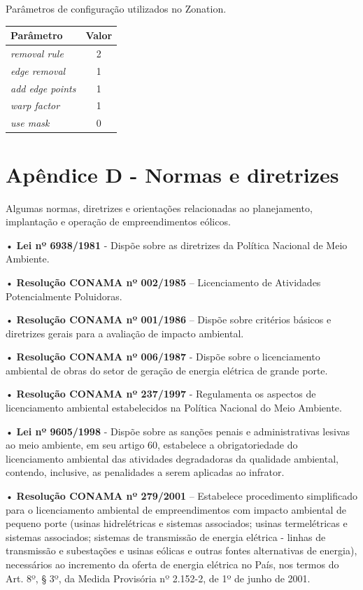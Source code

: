 \documentclass[
  oneside]{scrbook}
\begin{document}
Parâmetros de configuração utilizados no Zonation.

\begin{longtable}[t]{>{}lc}
\toprule
Parâmetro & Valor\\
\midrule
\em{removal rule} & 2\\
\em{edge removal} & 1\\
\em{add edge points} & 1\\
\em{warp factor} & 1\\
\em{use mask} & 0\\
\bottomrule
\end{longtable}

\newpage

\hypertarget{apuxeandice-d---normas-e-diretrizes}{%
\chapter{Apêndice D - Normas e diretrizes}\label{apuxeandice-d---normas-e-diretrizes}}

Algumas normas, diretrizes e orientações relacionadas ao planejamento, implantação e operação de empreendimentos eólicos.

• \textbf{Lei nº 6938/1981} - Dispõe sobre as diretrizes da Política Nacional de Meio Ambiente.

• \textbf{Resolução CONAMA nº 002/1985} -- Licenciamento de Atividades Potencialmente Poluidoras.

• \textbf{Resolução CONAMA nº 001/1986} -- Dispõe sobre critérios básicos e diretrizes gerais para a avaliação de impacto ambiental.

• \textbf{Resolução CONAMA nº 006/1987} - Dispõe sobre o licenciamento ambiental de obras do setor de geração de energia elétrica de grande porte.

• \textbf{Resolução CONAMA nº 237/1997} - Regulamenta os aspectos de licenciamento ambiental estabelecidos na Política Nacional do Meio Ambiente.

• \textbf{Lei nº 9605/1998} - Dispõe sobre as sanções penais e administrativas lesivas ao meio ambiente, em seu artigo 60, estabelece a obrigatoriedade do licenciamento ambiental das atividades degradadoras da qualidade ambiental, contendo, inclusive, as penalidades a serem aplicadas ao infrator.

• \textbf{Resolução CONAMA nº 279/2001} -- Estabelece procedimento simplificado para o licenciamento ambiental de empreendimentos com impacto ambiental de pequeno porte (usinas hidrelétricas e sistemas associados; usinas termelétricas e sistemas associados; sistemas de transmissão de energia elétrica - linhas de transmissão e subestações e usinas eólicas e outras fontes alternativas de energia), necessários ao incremento da oferta de energia elétrica no País, nos termos do Art. 8º, § 3º, da Medida Provisória nº 2.152-2, de 1º de junho de 2001.
\end{document}
